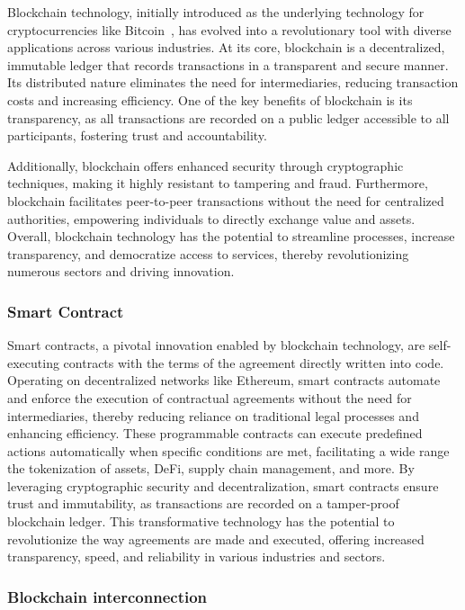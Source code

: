 \documentclass[conference]{IEEEtran}
\begin{document}
Blockchain technology, initially introduced as the underlying technology for cryptocurrencies like Bitcoin~\cite{Nakamoto2008BitcoinPeerToPeer}, has evolved into a revolutionary tool with diverse applications across various industries. At its core, blockchain is a decentralized, immutable ledger that records transactions in a transparent and secure manner. Its distributed nature eliminates the need for intermediaries, reducing transaction costs and increasing efficiency. One of the key benefits of blockchain is its transparency, as all transactions are recorded on a public ledger accessible to all participants, fostering trust and accountability.

Additionally, blockchain offers enhanced security through cryptographic techniques, making it highly resistant to tampering and fraud. Furthermore, blockchain facilitates peer-to-peer transactions without the need for centralized authorities, empowering individuals to directly exchange value and assets. Overall, blockchain technology has the potential to streamline processes, increase transparency, and democratize access to services, thereby revolutionizing numerous sectors and driving innovation.

\subsubsection{Smart Contract}

Smart contracts, a pivotal innovation enabled by blockchain technology, are self-executing contracts with the terms of the agreement directly written into code. Operating on decentralized networks like Ethereum, smart contracts automate and enforce the execution of contractual agreements without the need for intermediaries, thereby reducing reliance on traditional legal processes and enhancing efficiency.  These programmable contracts can execute predefined actions automatically when specific conditions are met, facilitating a wide range the tokenization of assets, DeFi, supply chain management, and more.  By leveraging cryptographic security and decentralization, smart contracts ensure trust and immutability, as transactions are recorded on a tamper-proof blockchain ledger. This transformative technology has the potential to revolutionize the way agreements are made and executed, offering increased transparency, speed, and reliability in various industries and sectors.

\subsubsection{Blockchain interconnection}
\end{document}

